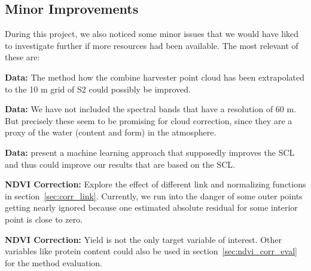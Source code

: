 {    \subsection{Minor Improvements}
        During this project, we also noticed some minor issues that we would have liked to investigate further if more resources had been available. The most relevant of these are:
        \begin{Nitemize}
            \item \textbf{Data:}
            The method how the combine harvester point cloud has been extrapolated to the 10 m grid of S2 could possibly be improved.
            \item \textbf{Data:}
            We have not included the spectral bands that have a resolution of 60 m. But precisely these seem to be promising for cloud correction, since they are a proxy of the water (content and form) in the atmosphere.
            \item \textbf{Data:}
            \cite{raiyaniSentinel2ImageScene2021} present a machine learning approach that supposedly improves the SCL and thus could improve our results that are based on the SCL.
            \item \textbf{NDVI Correction:}
            Explore the effect of different link and normalizing functions %
            in section~\ref{sec:corr_link}. Currently, we run into the danger of some outer points getting nearly ignored because one estimated absolute residual for some interior point is close to zero.
            \item \textbf{NDVI Correction:}
            Yield is not the only target variable of interest. Other variables like protein content could also be used in section~\ref{sec:ndvi_corr_eval} for the method evaluation. 
        \end{Nitemize}
}


